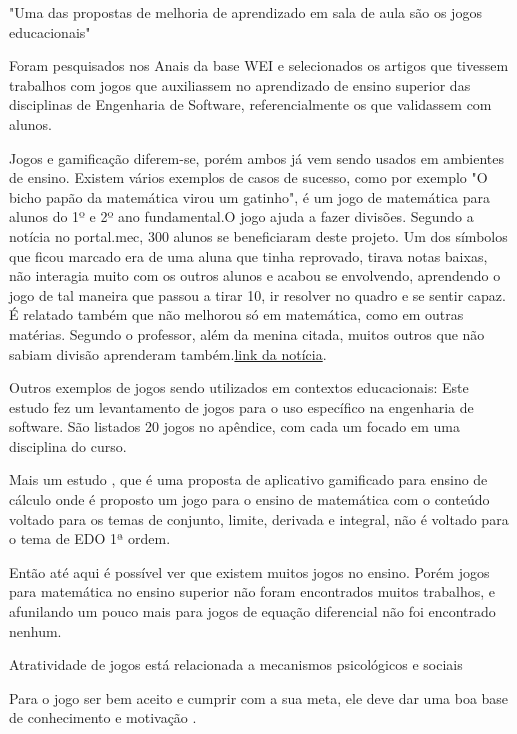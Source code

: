 "Uma das propostas de melhoria de aprendizado em sala de aula são os jogos educacionais" \cite[p. 4]{sucessoJogoEngSoft}

\begin{citacao}
Foram pesquisados nos Anais da base WEI e selecionados os artigos que tivessem trabalhos com jogos que auxiliassem no aprendizado de ensino superior das disciplinas de Engenharia de Software, referencialmente os que validassem com alunos. \cite{sucessoJogoEngSoft}
\end{citacao}


Jogos e gamificação diferem-se, porém ambos já vem sendo usados em ambientes de ensino. 
Existem vários exemplos de casos de sucesso, como por exemplo "O bicho papão da matemática virou um gatinho", é um jogo de matemática para alunos do 1º e 2º ano fundamental.O jogo ajuda a fazer divisões. Segundo a notícia no portal.mec, 300 alunos se beneficiaram deste projeto. Um dos símbolos que ficou marcado era de uma aluna que tinha reprovado, tirava notas baixas, não interagia muito com os outros alunos e acabou se envolvendo, aprendendo o jogo de tal maneira que passou a tirar 10, ir resolver no quadro e se sentir capaz. É relatado também que não melhorou só em matemática, como em outras matérias. Segundo o professor, além da menina citada, muitos outros que não sabiam divisão aprenderam também.\href{http://portal.mec.gov.br/component/content/article?id=72701}{link da notícia}.

Outros exemplos de jogos sendo utilizados em contextos educacionais: Este estudo \cite{sucessoJogoEngSoft} fez um levantamento de jogos para o uso específico na engenharia de software. São listados 20 jogos no apêndice, com cada um focado em uma disciplina do curso. 

Mais um estudo \cite{appcalculo}, que é uma proposta de aplicativo gamificado para ensino de cálculo onde é proposto um jogo para o ensino de matemática com o conteúdo voltado para os temas de  conjunto, limite, derivada e integral, não é voltado para o tema de EDO 1ª ordem.

Então até aqui é possível ver que existem muitos jogos no ensino. Porém jogos para matemática no ensino superior não foram encontrados muitos trabalhos, e afunilando um pouco mais para jogos de equação diferencial não foi encontrado nenhum.

Atratividade de jogos está relacionada a mecanismos psicológicos e sociais \cite{sucessoJogoEngSoft}

Para o jogo ser bem aceito e cumprir com a sua meta, ele deve dar uma boa base de conhecimento e motivação \cite{sucessoJogoEngSoft}.

